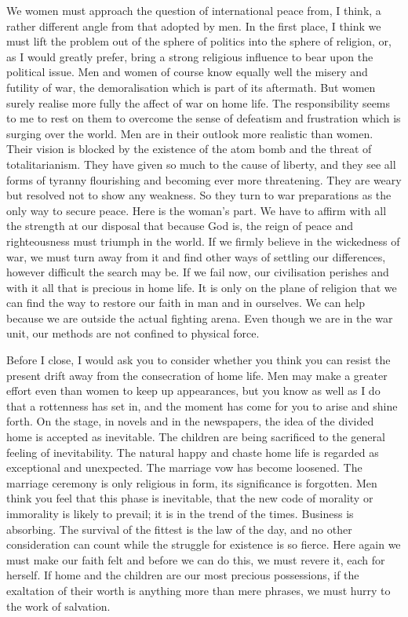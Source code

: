 We women must approach the question of international
peace from, I think, a rather different angle from that
adopted by men. In the first place, I think we must lift
the problem out of the sphere of politics into the sphere
of religion, or, as I would greatly prefer, bring a strong
religious influence to bear upon the political issue. Men
and women of course know equally well the misery and
futility of war, the demoralisation which is part of its
aftermath. But women surely realise more fully the affect
of war on home life. The responsibility seems to me to
rest on them to overcome the sense of defeatism and
frustration which is surging over the world. Men are in
their outlook more realistic than women. Their vision is
blocked by the existence of the atom bomb and the threat of
totalitarianism. They have given so much to the cause of
liberty, and they see all forms of tyranny flourishing and
becoming ever more threatening. They are weary but
resolved not to show any weakness. So they turn to war
preparations as the only way to secure peace. Here is the
woman's part. We have to affirm with all the strength at
our disposal that because God is, the reign of peace and
righteousness must triumph in the world. If we firmly
believe in the wickedness of war, we must turn away from it
and find other ways of settling our differences, however
difficult the search may be. If we fail now, our civilisation
perishes and with it all that is precious in home
life. It is only on the plane of religion that we can find
the way to restore our faith in man and in ourselves. We
can help because we are outside the actual fighting arena.
Even though we are in the war unit, our methods are not
confined to physical force.


Before I close, I would ask you to consider whether
you think you can resist the present drift away from the
consecration of home life. Men may make a greater effort
even than women to keep up appearances, but you know as
well as I do that a rottenness has set in, and the moment
has come for you to arise and shine forth. On the stage,
in novels and in the newspapers, the idea of the divided
home is accepted as inevitable. The children are being
sacrificed to the general feeling of inevitability. The
natural happy and chaste home life is regarded as
exceptional and unexpected. The marriage vow has become
loosened. The marriage ceremony is only religious in form,
its significance is forgotten. Men think you feel that
this phase is inevitable, that the new code of morality or
immorality is likely to prevail; it is in the trend of the
times. Business is absorbing. The survival of the fittest
is the law of the day, and no other consideration can count
while the struggle for existence is so fierce. Here again
we must make our faith felt and before we can do this, we
must revere it, each for herself. If home and the children
are our most precious possessions, if the exaltation of
their worth is anything more than mere phrases, we must
hurry to the work of salvation.

